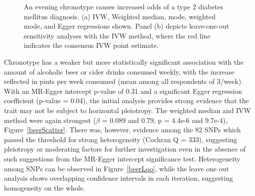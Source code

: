 \documentclass[journal,article,submit,moreauthors,pdftex]{Definitions/mdpi}
\begin{document}
\begin{figure}[htbp]
\begin{subfigure}{.5\linewidth}
\caption{}
\label{t2dmLoo}
\end{subfigure}
\caption{An evening chronotype causes increased odds of a type 2 diabetes mellitus diagnosis. (a) IVW, Weighted median, mode, weighted mode, and Egger regressions shown. Panel (b) depicts leave-one-out sensitivity analyses with the IVW method, where the red line indicates the consensus IVW point estimate.}
\label{t2dm}
\end{figure}

Chronotype has a weaker but more statistically significant association with the amount of alcoholic beer or cider drinks consumed weekly, with the increase reflected in pints per week consumed (mean among all respondents of 3/week). With an MR-Egger intercept p-value of 0.31 and a significant Egger regression coefficient (p-value = 0.04), the initial analysis provides strong evidence that the trait may not be subject to horizontal pleiotropy. The weighted median and IVW method were again strongest ($\beta$ = 0.089 and 0.79, p = 4.4e-6 and 9.7e-4), Figure~\ref{beerScatter}. There was, however, evidence among the 82 SNPs which passed the threshold for strong heterogeneity (Cochran Q = 333), suggesting pleiotropy or moderating factors for further investigation even in the absence of such suggestions from the MR-Egger intercept significance test. Heterogeneity among SNPs can be observed in Figure~\ref{beerLoo}, while the leave one out analysis shows overlapping confidence intervals in each iteration, suggesting homogeneity on the whole.
\end{document}
